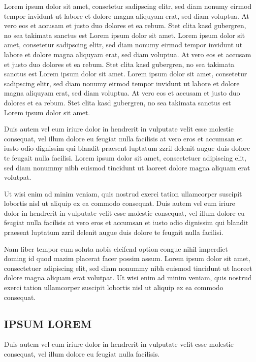 \documentclass[]{../metanetpaper}
\begin{document}
Lorem ipsum dolor sit amet, consetetur sadipscing elitr, sed diam nonumy eirmod tempor invidunt ut labore et dolore magna aliquyam erat, sed diam voluptua. At vero eos et accusam et justo duo dolores et ea rebum. Stet clita kasd gubergren, no sea takimata sanctus est Lorem ipsum dolor sit amet. Lorem ipsum dolor sit amet, consetetur sadipscing elitr, sed diam nonumy eirmod tempor invidunt ut labore et dolore magna aliquyam erat, sed diam voluptua. At vero eos et accusam et justo duo dolores et ea rebum. Stet clita kasd gubergren, no sea takimata sanctus est Lorem ipsum dolor sit amet. Lorem ipsum dolor sit amet, consetetur sadipscing elitr, sed diam nonumy eirmod tempor invidunt ut labore et dolore magna aliquyam erat, sed diam voluptua. At vero eos et accusam et justo duo dolores et ea rebum. Stet clita kasd gubergren, no sea takimata sanctus est Lorem ipsum dolor sit amet.   

Duis autem vel eum iriure dolor in hendrerit in vulputate velit esse molestie consequat, vel illum dolore eu feugiat nulla facilisis at vero eros et accumsan et iusto odio dignissim qui blandit praesent luptatum zzril delenit augue duis dolore te feugait nulla facilisi. Lorem ipsum dolor sit amet, consectetuer adipiscing elit, sed diam nonummy nibh euismod tincidunt ut laoreet dolore magna aliquam erat volutpat.   

Ut wisi enim ad minim veniam, quis nostrud exerci tation ullamcorper suscipit lobortis nisl ut aliquip ex ea commodo consequat. Duis autem vel eum iriure dolor in hendrerit in vulputate velit esse molestie consequat, vel illum dolore eu feugiat nulla facilisis at vero eros et accumsan et iusto odio dignissim qui blandit praesent luptatum zzril delenit augue duis dolore te feugait nulla facilisi.   

Nam liber tempor cum soluta nobis eleifend option congue nihil imperdiet doming id quod mazim placerat facer possim assum. Lorem ipsum dolor sit amet, consectetuer adipiscing elit, sed diam nonummy nibh euismod tincidunt ut laoreet dolore magna aliquam erat volutpat. Ut wisi enim ad minim veniam, quis nostrud exerci tation ullamcorper suscipit lobortis nisl ut aliquip ex ea commodo consequat.   
\subsection{IPSUM LOREM}
Duis autem vel eum iriure dolor in hendrerit in vulputate velit esse molestie consequat, vel illum dolore eu feugiat nulla facilisis.   
\end{document}
